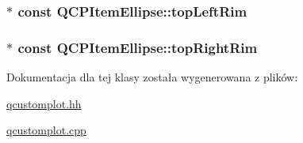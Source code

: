 \subsubsection[{\texorpdfstring{top\+Left\+Rim}{topLeftRim}}]{$\ast$ const Q\+C\+P\+Item\+Ellipse\+::top\+Left\+Rim}\hypertarget{class_q_c_p_item_ellipse_a33ebd2a751b63b9240edc9aa46c19eff}{}\label{class_q_c_p_item_ellipse_a33ebd2a751b63b9240edc9aa46c19eff}
\subsubsection[{\texorpdfstring{top\+Right\+Rim}{topRightRim}}]{$\ast$ const Q\+C\+P\+Item\+Ellipse\+::top\+Right\+Rim}\hypertarget{class_q_c_p_item_ellipse_a744446970b38a4a3bbea46d722b7c54d}{}\label{class_q_c_p_item_ellipse_a744446970b38a4a3bbea46d722b7c54d}


Dokumentacja dla tej klasy została wygenerowana z plików\+:\begin{DoxyCompactItemize}
\item 
\hyperlink{qcustomplot_8hh}{qcustomplot.\+hh}\item 
\hyperlink{qcustomplot_8cpp}{qcustomplot.\+cpp}\end{DoxyCompactItemize}
